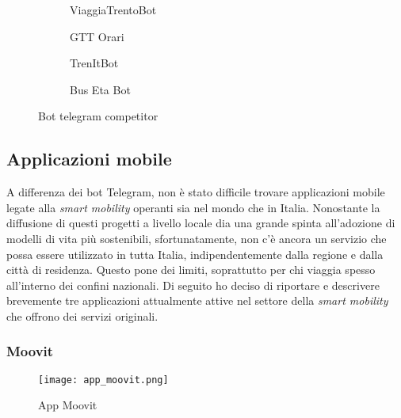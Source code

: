 \begin{figure}[htb]
    \centering 
\begin{subfigure}{0.20\textwidth}
\caption{ViaggiaTrentoBot}
\label{fig:viaggia_trento}
\end{subfigure}\hfil
\begin{subfigure}{0.20\textwidth}
\caption{GTT Orari}
\label{fig:gtt_orari}
\end{subfigure}\hfil 
\begin{subfigure}{0.20\textwidth}
\caption{TrenItBot}
\label{fig:trenit_bot}
\end{subfigure}\hfil 
\begin{subfigure}{0.20\textwidth}
\caption{Bus Eta Bot}
\label{fig:bus_eta_bot}
\end{subfigure}
\caption{
\label{fig:bot_competitor}Bot telegram competitor}
\end{figure}

\subsection{Applicazioni mobile}
A differenza dei bot Telegram, non è stato difficile trovare applicazioni mobile legate alla \textit{smart mobility} operanti sia nel mondo che in Italia. Nonostante la diffusione di questi progetti a livello locale dia una grande spinta all’adozione di modelli di vita più sostenibili, sfortunatamente, non c’è ancora un servizio che possa essere utilizzato in tutta Italia, indipendentemente dalla regione e dalla città di residenza. Questo pone dei limiti, soprattutto per chi viaggia spesso all’interno dei confini nazionali. Di seguito ho deciso di riportare e descrivere brevemente tre applicazioni attualmente attive nel settore della \textit{smart mobility} che offrono dei servizi originali.

\newpage

\subsubsection{Moovit}

\begin{wrapfigure}{r}{0.50\textwidth}
\centering
\texttt{[image: app\_moovit.png]}
\caption{App Moovit}
\label{fig:app_moovit}
\end{wrapfigure}


